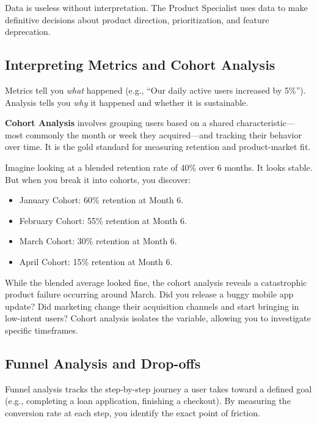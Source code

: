 \documentclass[
  11pt,
  openany,
  oneside]{book}
\providecommand{\tightlist}{%
  \setlength{\itemsep}{0pt}\setlength{\parskip}{0pt}}
\begin{document}
Data is useless without interpretation. The Product Specialist uses data
to make definitive decisions about product direction, prioritization,
and feature deprecation.

\subsection{Interpreting Metrics and Cohort
Analysis}\label{interpreting-metrics-and-cohort-analysis}

Metrics tell you \emph{what} happened (e.g., ``Our daily active users
increased by 5\%''). Analysis tells you \emph{why} it happened and
whether it is sustainable.

\textbf{Cohort Analysis} involves grouping users based on a shared
characteristic---most commonly the month or week they acquired---and
tracking their behavior over time. It is the gold standard for measuring
retention and product-market fit.

Imagine looking at a blended retention rate of 40\% over 6 months. It
looks stable. But when you break it into cohorts, you discover:

\begin{itemize}
\tightlist
\item
  January Cohort: 60\% retention at Month 6.
\item
  February Cohort: 55\% retention at Month 6.
\item
  March Cohort: 30\% retention at Month 6.
\item
  April Cohort: 15\% retention at Month 6.
\end{itemize}

While the blended average looked fine, the cohort analysis reveals a
catastrophic product failure occurring around March. Did you release a
buggy mobile app update? Did marketing change their acquisition channels
and start bringing in low-intent users? Cohort analysis isolates the
variable, allowing you to investigate specific timeframes.

\subsection{Funnel Analysis and
Drop-offs}\label{funnel-analysis-and-drop-offs}

Funnel analysis tracks the step-by-step journey a user takes toward a
defined goal (e.g., completing a loan application, finishing a
checkout). By measuring the conversion rate at each step, you identify
the exact point of friction.
\end{document}
